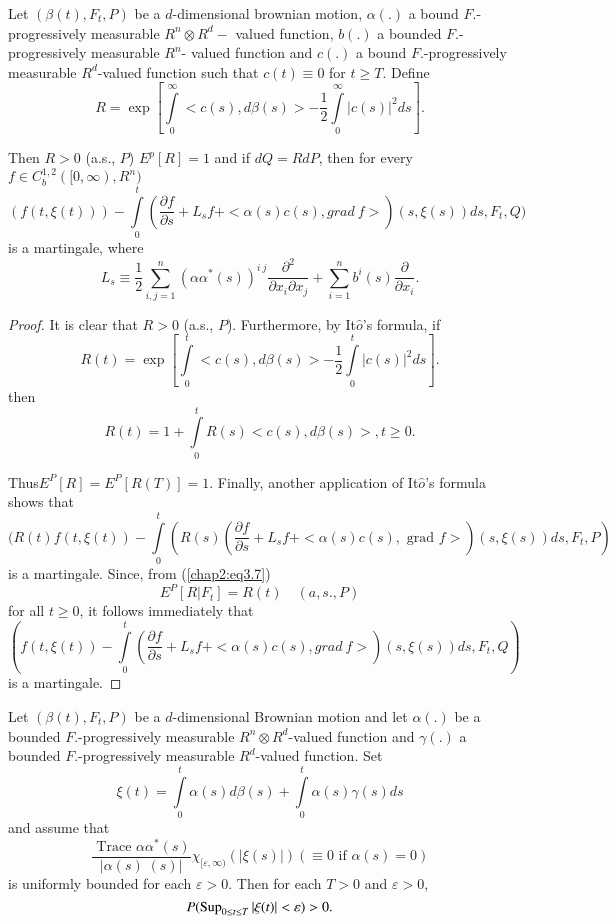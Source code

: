 \setcounter{lemma}{4}
\begin{lemma}\label{chap2:lem3.5} %
Let $(\beta(t), F_t, P)$ be a $d$-dimensional brownian motion,
$\alpha(.)$ a bound $F$.-progressively measurable $R^n \otimes R^d-$
valued function, $b(.)$ a bounded $F$.-progressively measurable $R^n$-
valued function and $c(.)$ a bound $F$.-progressively measurable
$R^d$-valued function such that $c(t)\equiv 0$ for $t \geq T$. Define 
\begin{equation*}
R=\exp[\int\limits_0^{\infty}< c(s), d \beta(s)>
  -\frac{1}{2}\int\limits_0^{\infty}|c(s)|^2 ds].\tag{3.6}\label{chap2:eq3.6}  
\end{equation*}

Then $R>0$ (a.s., $P$) $E^p[R]=1$ and if $dQ=RdP$, then for every $f
\in C_b^{1,2}([0, \infty), R^n)$ 
$$
(f(t, \xi(t)))-\int\limits_0^t (\frac{\partial f}{\partial s}+ L_sf+<
  \alpha (s)c(s), grad~f>)(s, \xi(s))ds, F_t, Q) 
$$ 
is a martingale, where
$$ 
L_s \equiv \frac{1}{2} \sum_{i, j=1}^{n}(\alpha \alpha^*
(s))^{i~j}\frac{\partial^2}{\partial x_i \partial x_j}+ \sum^n_{i=1}
b^i(s)\frac{\partial}{\partial x_i}. 
$$
\end{lemma}

\begin{proof}
It is clear that $R>0$ (a.s., $P$). Furthermore, by It$\hat{o}$'s
formula, if 
$$
R(t)= \exp [\int\limits_0^t < c(s), d
  \beta(s)>-\frac{1}{2}\int\limits_0^t | c(s)|^2 ds]. 
$$
then
\begin{equation*}
R(t)=1+\int\limits_0^t R(s)<c(s), d\beta(s)>, t \geq
0. \tag{3.7}\label{chap2:eq3.7}   
\end{equation*}

Thus\pageoriginale $E^P[R]=E^P[R(T)]=1$. Finally, another application of
It$\hat{o}$'s formula shows that 
{\fontsize{10pt}{12pt}\selectfont
$$
(R(t)f(t, \xi(t))-\int\limits_0^t(R(s)(\frac{\partial f}{\partial
  s}+L_sf+<\alpha(s)c(s), \text{ grad } f>)(s, \xi(s))ds, F_t, P) 
$$}\relax
is a martingale. Since, from (\ref{chap2:eq3.7}) 
$$
E^P[R| F_t]=R(t) \quad (a,s., P) 
$$
for all $t \geq 0$, it follows immediately that 
$$
(f(t,\xi(t))-\int\limits_0^t(\frac{\partial f}{\partial
  s}+L_sf+<\alpha(s)c(s), grad~f>)(s, \xi(s))ds, F_t, Q) 
$$
is a martingale.
\end{proof}

\setcounter{theorem}{7}
\begin{theorem}\label{chap2:thm3.8}%
Let $(\beta(t),F_t,P)$ be a $d$-dimensional Brownian motion and let
$\alpha(.)$ be a bounded $F$.-progressively measurable $R^n \otimes
R^d$-valued function and $\gamma(.)$ a bounded $F$.-progressively
measurable $R^d$-valued function. Set 
$$
\xi(t)=\int\limits_0^t \alpha(s) d\beta(s)+\int\limits_0^t
\alpha(s)\gamma (s)ds 
$$
and assume that
$$
\frac{\text{ Trace }\alpha \alpha^*(s)}{|\alpha
  (s) \; (s)|}\chi_{[\varepsilon, \infty)}(|\xi (s)|)(\equiv 0 \text{  if
  } \alpha(s)=0) 
$$
is uniformly bounded for each $\varepsilon > 0$. Then for each $T > 0$
and $\varepsilon > 0$, 
$$
P(\operatorname{Sup}_{0 \leq t \leq T}|\xi(t)| < \varepsilon)> 0. 
$$
\end{theorem}

